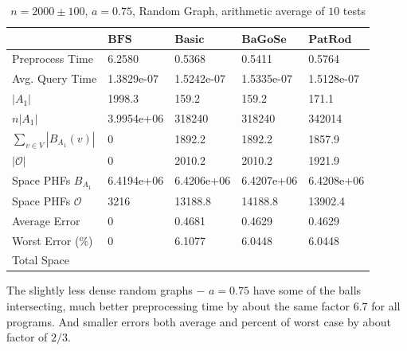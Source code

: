 \documentclass[shortabstract, lic, english]{iithesis}
\theoremstyle{definition} \newtheorem{definition}{Definition}[chapter]
\theoremstyle{plain} \newtheorem{remark}[definition]{Observation}
\theoremstyle{plain} \newtheorem{theorem}[definition]{Theorem}
\theoremstyle{plain} \newtheorem{lemma}[definition]{Lemma}
\theoremstyle{plain} \newtheorem{conjecture}[definition]{Conjecture}
\begin{document}
\begin{table}[H] \label{test:random.a0.75}
    \centering
    \begin{tabular}{ |p{3cm}||p{2cm}|p{2cm}|p{2cm}|p{2cm}|  } 
        \hline
        & $\mathbf{BFS}$ & $\mathbf{Basic}$ & $\mathbf{BaGoSe}$ & $\mathbf{PatRod}$ \\
        \hline
        \hline
        Preprocess Time                 & 6.2580     & 0.5368     & 0.5411      & 0.5764     \\
        \hline
        Avg. Query Time                 & 1.3829e-07 & 1.5242e-07 & 1.5335e-07  & 1.5128e-07 \\
        \hline
        $|A_1|$                         & 1998.3     & 159.2      &  159.2      & 171.1      \\
        \hline
        $n |A_1|$                       & 3.9954e+06 & 318240     &  318240     & 342014     \\
        \hline
        $\sum_{v \in V} |B_{A_1}(v)| $  & 0          & 1892.2     & 1892.2      & 1857.9     \\
        \hline
        $|\mathcal{O}|$                 & 0          & 2010.2     & 2010.2      & 1921.9     \\
        \hline
        Space PHFs $B_{A_1}$            & 6.4194e+06 & 6.4206e+06 & 6.4207e+06  & 6.4208e+06 \\
        \hline
        Space PHFs $\mathcal{O}$        & 3216       & 13188.8    & 14188.8     & 13902.4    \\
        \hline
        Average Error                   & 0          & 0.4681     & 0.4629      & 0.4629     \\
        \hline
        Worst Error (\%)                & 0          & 6.1077     & 6.0448      & 6.0448     \\
        \hline
        Total Space                     &            &            &             &            \\
        \hline

    \end{tabular}
    \caption{$n = 2000 \pm 100$, $a = 0.75$, Random Graph, arithmetic average of $10$ tests}
\end{table}

The slightly less dense random graphs $-$ $a=0.75$ have some of the balls intersecting, much better preprocessing time by about the same factor $6.7$ for all programs.
And smaller errors both average and percent of worst case by about factor of $2/3$.
\end{document}
